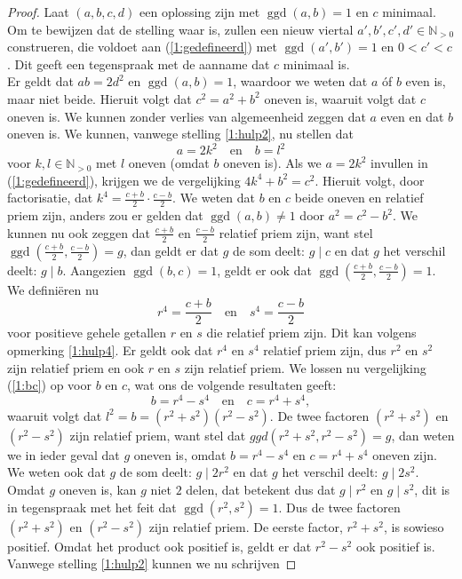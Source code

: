 \documentclass[12pt,reqno]{article}
\newcommand*{\NO}{\ensuremath{\mathbb{N}_{>0}}}
\theoremstyle{theorem}
\theoremstyle{definition}
\DeclareMathOperator{\ggd}{ggd}
\begin{document}
\begin{proof}
		Laat $(a, b, c, d)$ een oplossing zijn met $\ggd(a,b) = 1$ en $c$ minimaal. Om te bewijzen dat de stelling waar is, zullen een nieuw viertal $a', b', c', d' \in\NO$ construeren, die voldoet aan (\ref{1:gedefineerd}) met $\ggd(a',b') = 1$ en $0 < c' < c$. Dit geeft een tegenspraak met de aanname dat $c$ minimaal is.\\
								
		Er geldt dat $ab = 2d^2$ en $\ggd(a,b)=1$, waardoor we weten dat $a$ \'of $b$ even is, maar niet beide. Hieruit volgt dat $c^2 = a^2 + b^2$ oneven is, waaruit volgt dat $c$ oneven is. We kunnen zonder verlies van algemeenheid zeggen dat $a$ even en dat $b$ oneven is. We kunnen, vanwege stelling \ref{1:hulp2}, nu stellen dat
		\begin{equation*}
			a = 2k^2 \quad \text{en} \quad b = l^2
		\end{equation*}
		voor $k,l\in\NO$ met $l$ oneven (omdat $b$ oneven is). Als we $a = 2k^2$ invullen in (\ref{1:gedefineerd}), krijgen we de vergelijking $4k^4 + b^2 = c^2$. Hieruit volgt, door factorisatie, dat $k^4 = \frac{c+b}{2} \cdot \frac{c-b}{2}$. We weten dat $b$ en $c$ beide oneven en relatief priem zijn, anders zou er gelden dat $\ggd(a,b)\neq1$ door $a^2 = c^2 - b^2$. We kunnen nu ook zeggen dat $\frac{c+b}{2}$ en $\frac{c-b}{2}$ relatief priem zijn, want stel $\ggd(\frac{c+b}{2},\frac{c-b}{2})=g$, dan geldt er dat $g$ de som deelt: $g \mid c$ en dat $g$ het verschil deelt: $g \mid b$. Aangezien $\ggd(b,c) = 1$, geldt er ook dat $\ggd(\frac{c+b}{2}, \frac{c-b}{2}) = 1$. We defini\"eren nu
		\begin{equation}\label{1:bc}
			r^4 = \frac{c+b}{2} \quad \text{en} \quad s^4 = \frac{c-b}{2}
		\end{equation}
		voor positieve gehele getallen $r$ en $s$ die relatief priem zijn. Dit kan volgens opmerking \ref{1:hulp4}. Er geldt ook dat $r^4$ en $s^4$ relatief priem zijn, dus $r^2$ en $s^2$ zijn relatief priem en ook $r$ en $s$ zijn relatief priem. We lossen nu vergelijking (\ref{1:bc}) op voor $b$ en $c$, wat ons de volgende resultaten geeft:
		\begin{equation*}
			b = r^4 - s^4 \quad \text{en} \quad c = r^4 + s^4,
		\end{equation*}
		waaruit volgt dat $l^2 = b = (r^2 + s^2) (r^2 - s^2)$. De twee factoren $(r^2 + s^2)$ en $(r^2 - s^2)$ zijn relatief priem, want stel dat $ggd(r^2 + s^2, r^2 - s^2) = g$, dan weten we in ieder geval dat $g$ oneven is, omdat $b = r^4 - s^4$ en $c = r^4 + s^4$ oneven zijn. We weten ook dat $g$ de som deelt: $g \mid 2r^2$ en dat $g$ het verschil deelt: $g \mid 2s^2$. Omdat $g$ oneven is, kan $g$ niet $2$ delen, dat betekent dus dat $g \mid r^2$ en $g \mid s^2$, dit is in tegenspraak met het feit dat $\ggd(r^2, s^2) = 1$. Dus de twee factoren $(r^2 + s^2)$ en $(r^2 - s^2)$ zijn relatief priem. De eerste factor, $r^2 + s^2$, is sowieso positief. Omdat het product ook positief is, geldt er dat $r^2 - s^2$ ook positief is. Vanwege stelling \ref{1:hulp2} kunnen we nu schrijven 

\end{proof}
\end{document}
